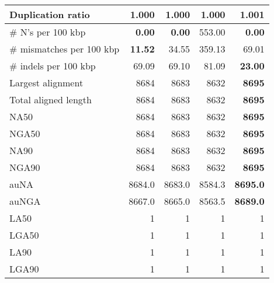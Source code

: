 \documentclass[12pt,a4paper]{article}
\begin{document}
\begin{table}[ht]
\begin{center}
\begin{tabular}{|l*{4}{|r}|}
Duplication ratio & {\bf 1.000} & {\bf 1.000} & {\bf 1.000} & 1.001 \\ \hline
\# N's per 100 kbp & {\bf 0.00} & {\bf 0.00} & 553.00 & {\bf 0.00} \\ \hline
\# mismatches per 100 kbp & {\bf 11.52} & 34.55 & 359.13 & 69.01 \\ \hline
\# indels per 100 kbp & 69.09 & 69.10 & 81.09 & {\bf 23.00} \\ \hline
Largest alignment & 8684 & 8683 & 8632 & {\bf 8695} \\ \hline
Total aligned length & 8684 & 8683 & 8632 & {\bf 8695} \\ \hline
NA50 & 8684 & 8683 & 8632 & {\bf 8695} \\ \hline
NGA50 & 8684 & 8683 & 8632 & {\bf 8695} \\ \hline
NA90 & 8684 & 8683 & 8632 & {\bf 8695} \\ \hline
NGA90 & 8684 & 8683 & 8632 & {\bf 8695} \\ \hline
auNA & 8684.0 & 8683.0 & 8584.3 & {\bf 8695.0} \\ \hline
auNGA & 8667.0 & 8665.0 & 8563.5 & {\bf 8689.0} \\ \hline
LA50 & 1 & 1 & 1 & 1 \\ \hline
LGA50 & 1 & 1 & 1 & 1 \\ \hline
LA90 & 1 & 1 & 1 & 1 \\ \hline
LGA90 & 1 & 1 & 1 & 1 \\ \hline
\end{tabular}
\end{center}
\end{table}
\end{document}
